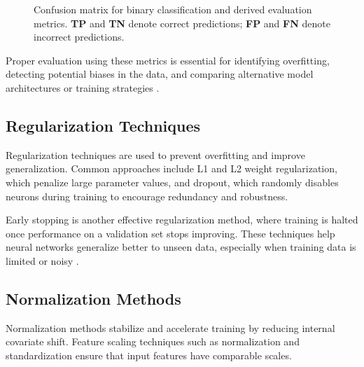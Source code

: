 \begin{figure}[htbp]
\caption{Confusion matrix for binary classification and derived evaluation metrics. \textcolor{green!60!black}{\textbf{TP}} and \textcolor{green!60!black}{\textbf{TN}} denote correct predictions; \textcolor{orange!80!black}{\textbf{FP}} and 
\textcolor{red!70!black}{\textbf{FN}} denote incorrect predictions.}
\label{fig:confusion_matrix}
\end{figure}

Proper evaluation using these metrics is essential for identifying overfitting, detecting potential biases in the data, and comparing alternative model architectures or training strategies \cite{raghu2020surveydeeplearningscientific}.

\subsection{Regularization Techniques}

Regularization techniques are used to prevent overfitting and improve generalization. Common approaches include L1 and L2 weight regularization, which penalize large parameter values, and dropout, which randomly disables neurons during training to encourage redundancy and robustness.

Early stopping is another effective regularization method, where training is halted once performance on a validation set stops improving. These techniques help neural networks generalize better to unseen data, especially when training data is limited or noisy \cite{hammad2024artificialneuralnetworkdeep}.

\subsection{Normalization Methods}

Normalization methods stabilize and accelerate training by reducing internal covariate shift. Feature scaling techniques such as normalization and standardization ensure that input features have comparable scales.

